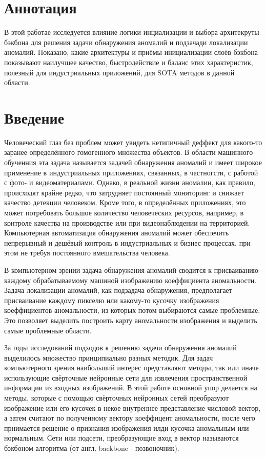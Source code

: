 \documentclass{article}
\begin{document}
\newpage
\begin{large}
	
\tableofcontents

\newpage
\section{Аннотация}

В этой работае исследуется влияние логики инциализации и выбора архитекруты бэкбона для решения задачи обнаружения аномалий и подзачади локализации аномалий. Показано, какие архитектуры и приёмы инициализации слоёв бэкбона показывают наилучшее качество, быстродействие и баланс этих характеристик, полезный для индустриальных приложений, для SOTA методов в данной области.

\section{Введение}

Человеческий глаз без проблем может увидеть нетипичный деффект для какого-то заранее определённого гомогенного множества объектов. В области машинного обученния эта задача называется задачей обнаружения аномалий и имеет широкое применение в индустриальных приложениях, связанных, в частногсти, с работой с фото- и видеоматериалами. Однако, в реальной жизни аномалии, как правило, происходят крайне редко, что затрудняет постоянный мониторинг и снижает качество детекции человеком. Кроме того, в определённых приложениях, это может потребовать большое количество человеческих ресурсов, например, в контроле качества на производстве или при видеонаблюдении на территорией. Компьютерная автоматизация обнаружения аномалий может обеспечить непрерывный и дешёвый контроль в индустриальных и бизнес процессах, при этом не требуя постоянного вмешательства человека.

В компьютерном зрении задача обнаружения аномалий сводится к присваиванию каждому обрабатываемому машиной изображению коеффициента аномальности. Задача локализации аномалий, как подзадача обнаружения, предполагает присваивание каждому пикселю или какому-то кусочку изображения коеффициентов аномальности, из которых потом выбираются самые проблемные. Это позволяет выделить построить карту аномальности изображения и выделить самые проблемные области.

За годы исследований подходов к решению задачи обнаружения аномалий выделилось множество принципиально разных методик. Для задач компьютерного зрения наибольший интерес представляют методы, так или иначе использующие свёрточные нейронные сети для извлечения пространственной информации из входных изображений. В этой работе основной упор делается на методы, которые с помощью свёрточных нейронных сетей преобразуют изображение или его кусочек в некое внутреннее представление числовой вектор, а затем считают по полученному вектору коеффицент аномальности, после чего прнимается решение о признания изображения илди кусочка аномальным или нормальным. Сети или подсети, преобразующие вход в вектор называются бэкбоном алгоритма (от англ. backbone - позвоночник).


\end{large}
\end{document}

